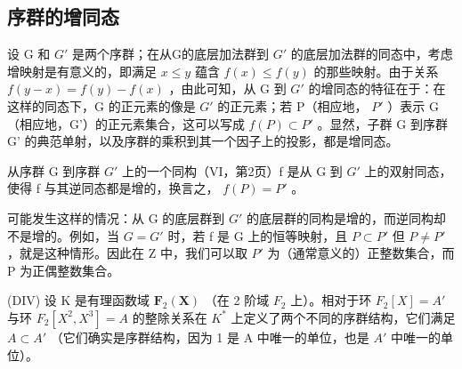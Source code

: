 \subsection{序群的增同态}

设 G 和 \(G'\) 是两个序群；在从G的底层加法群到 \(G'\) 的底层加法群的同态中，考虑增映射是有意义的，即满足 \(x \leqslant y\) 蕴含 \(f(x) \leqslant f(y)\) 的那些映射。由于关系 \(f(y - x) = f(y) - f(x)\) ，由此可知，从 G 到 \(G'\) 的增同态的特征在于：在这样的同态下，G 的正元素的像是 \(G'\) 的正元素；若 P（相应地， \(P'\) ）表示 G（相应地，G'）的正元素集合，这可以写成 \(f(P) \subset P'\) 。显然，子群 G 到序群 G' 的典范单射，以及序群的乘积到其一个因子上的投影，都是增同态。

从序群 G 到序群 \(G'\) 上的一个同构（VI，第2页）f 是从 G 到 \(G'\) 上的双射同态，使得 f 与其逆同态都是增的，换言之， \(f(P) = P'\) 。

可能发生这样的情况：从 G 的底层群到 \(G'\) 的底层群的同构是增的，而逆同构却不是增的。例如，当 \(G = G'\) 时，若 f 是 G 上的恒等映射，且 \(P \subset P'\) 但 \(P \neq P'\) ，就是这种情形。因此在 Z 中，我们可以取 \(P'\) 为（通常意义的）正整数集合，而 P 为正偶整数集合。

(DIV) 设 K 是有理函数域 \(\mathbf{F}_{2}(\mathbf{X})\) （在 2 阶域 \(F_{2}\) 上）。相对于环 \(F_{2}[X] = A'\) 与环 \(F_{2}[X^{2}, X^{3}] = A\) 的整除关系在 \(K^{*}\) 上定义了两个不同的序群结构，它们满足 \(A \subset A'\) （它们确实是序群结构，因为 1 是 A 中唯一的单位，也是 \(A'\) 中唯一的单位）。

